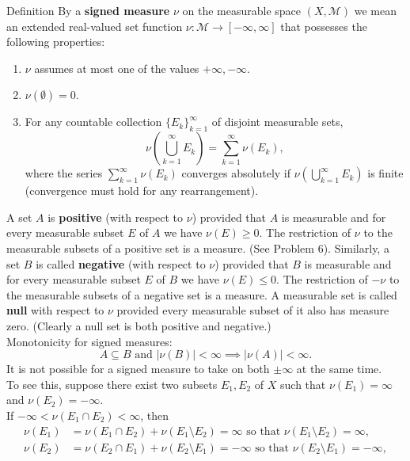 \begin{flushleft}
	\begin{namedthm*}{Definition}
		By a \textbf{signed measure} $\nu$ on the measurable space $(X,\mathcal{M})$ we mean an extended real-valued set function $\nu:\mathcal{M}\to[-\infty,\infty]$ that possesses the following properties:
		\begin{enumerate}[label=(\roman*),align=left]  
			\item $\nu$ assumes at most one of the values $+\infty,-\infty$.
			\item $\nu(\emptyset)=0$.
			\item For any countable collection $\{E_k\}_{k=1}^\infty$ of disjoint measurable sets,
			\[
				\nu\left(\bigcup_{k=1}^\infty E_k\right)=\sum_{k=1}^\infty\nu(E_k),
			\]
			where the series $\sum_{k=1}^\infty\nu(E_k)$ converges absolutely if $\nu(\bigcup_{k=1}^\infty E_k)$ is finite (convergence must hold for any rearrangement).
		\end{enumerate}
	\end{namedthm*}
	A set $A$ is \textbf{positive} (with respect to $\nu$) provided that $A$ is measurable and for every measurable subset $E$ of $A$ we have $\nu(E)\ge0$.
	The restriction of $\nu$ to the measurable subsets of a positive set is a measure.
	(See Problem 6).
	Similarly, a set $B$ is called \textbf{negative} (with respect to $\nu$) provided that $B$ is measurable and for every measurable subset $E$ of $B$ we have $\nu(E)\le0$.
	The restriction of $-\nu$ to the measurable subsets of a negative set is a measure.
	A measurable set is called \textbf{null} with respect to $\nu$ provided every measurable subset of it also has measure zero.
	(Clearly a null set is both positive and negative.)
	\\Monotonicity for signed measures:
	\[
	A\subseteq B\text{ and }|\nu(B)|<\infty\implies|\nu(A)|<\infty.
	\]
	It is not possible for a signed measure to take on both $\pm\infty$ at the same time.
		\\To see this, suppose there exist two subsets $E_1,E_2$ of $X$ such that $\nu(E_1)=\infty$ and $\nu(E_2)=-\infty$.
		\\If $-\infty<\nu(E_1\cap E_2)<\infty$, then 
		\begin{align*}
			\nu(E_1)&=\nu(E_1\cap E_2)+\nu(E_1\setminus E_2)=\infty\text{ so that }\nu(E_1\setminus E_2)=\infty,\\
			\nu(E_2)&=\nu(E_2\cap E_1)+\nu(E_2\setminus E_1)=-\infty\text{ so that }\nu(E_2\setminus E_1)=-\infty,
		\end{align*}

\end{flushleft}
